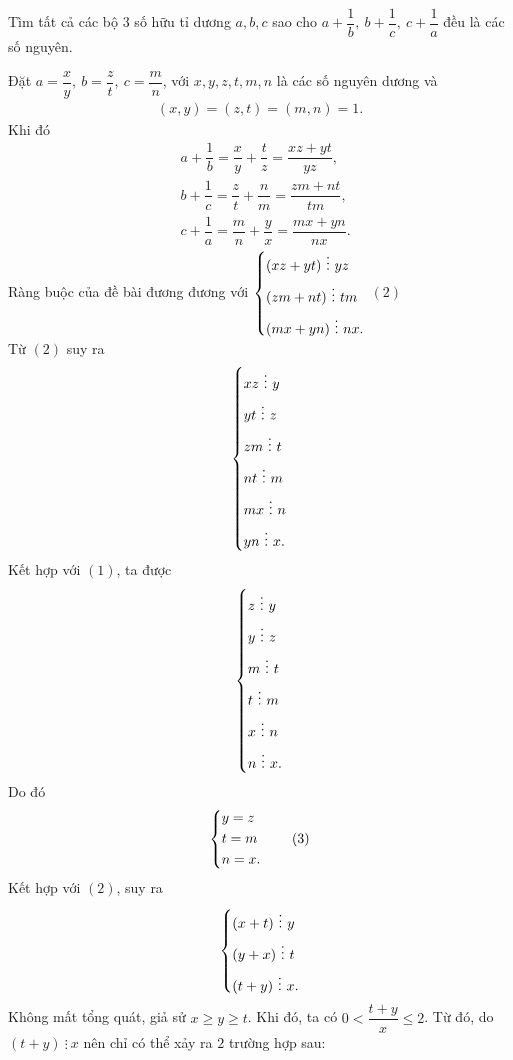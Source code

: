 \begin{bt}%
Tìm tất cả các bộ $ 3 $ số hữu tỉ dương $ a, b, c $ sao cho $ a + \dfrac{1}{b},\ b + \dfrac{1}{c},\ c + \dfrac{1}{a} $ đều là các số nguyên.	
\loigiai
{
Đặt $ a = \dfrac{x}{y},\ b = \dfrac{z}{t}, \ c = \dfrac{m}{n} $, với $ x, y, z, t, m, n $ là các số nguyên dương và 
\begin{align*} (x,y) = (z,t) = (m,n) =1.  \tag{1}
\end{align*}
Khi đó 
\begin{align*}
	& a + \dfrac{1}{b} = \dfrac{x}{y} + \dfrac{t}{z} = \dfrac{xz + yt}{yz},\\
	& b + \dfrac{1}{c} = \dfrac{z}{t} + \dfrac{n}{m} = \dfrac{zm+nt}{tm},\\
	& c+ \dfrac{1}{a} = \dfrac{m}{n} + \dfrac{y}{x} = \dfrac{mx + yn}{nx}.
\end{align*}
Ràng buộc của đề bài đương đương với $ \heva{ & (xz + yt) \ \vdots \ yz \\ & (zm + nt) \ \vdots \ tm \\ & (mx + yn)\ \vdots \ nx.  } $ \hfill $ (2) $\\
Từ $ (2) $ suy ra $$ \left\{\begin{aligned} & xz \ \vdots \ y \\ & yt \  \vdots \ z \\ & zm \ \vdots \ t \\ &nt \ \vdots \ m \\ & mx \ \vdots \ n \\ & yn \ \vdots \ x.  \end{aligned}\right. $$
Kết hợp với $ (1) $, ta được $$ \heva{ & z \ \vdots \ y  \\ & y \ \vdots \ z  \\ & m \ \vdots \ t   \\ & t \ \vdots \ m  \\ & x \ \vdots \ n  \\   & n \ \vdots \ x.     } $$
Do đó 
\begin{align*}
\left\{\begin{aligned} & y = z\\ & t = m \\& n = x. \end{aligned}\right. \tag{3}
\end{align*}
Kết hợp với $ (2) $, suy ra $$ \left\{\begin{aligned}& (x+t) \ \vdots \ y \\ & (y + x) \ \vdots \  t \\ & ( t+ y ) \ \vdots \  x.  \end{aligned}\right. $$
Không mất  tổng quát, giả sử $ x \geq y \geq t $. Khi đó,  ta có $ 0 < \dfrac{t + y}{x } \leq 2 $. Từ đó, do $ (t + y) \ \vdots \ x $ nên chỉ có thể xảy ra $ 2 $ trường hợp sau:
\begin{itemize}

\end{itemize}}
\end{bt}
